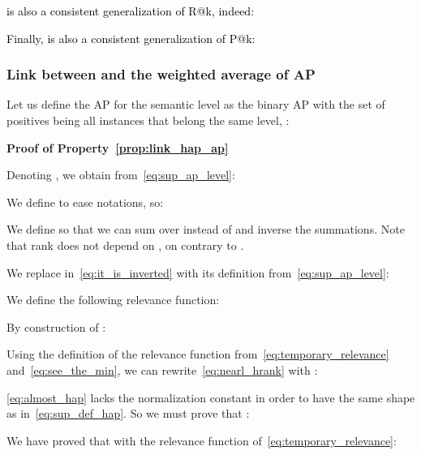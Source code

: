 \medbreak
\textcolor{black}{ is also a consistent generalization of R@k, indeed: }

\medbreak
\textcolor{black}{Finally,  is also a consistent generalization of P@k:\\ }


\subsubsection{Link between  and the weighted average of AP}

Let us define the AP for the semantic level  as the binary AP with the set of positives being all instances that belong the same level, \ie :






\medbreak
\medbreak
\textbf{Proof of Property~\ref{prop:link_hap_ap}}

\medbreak
Denoting , we obtain from~\cref{eq:sup_ap_level}:



We define  to ease notations, so:



We define  so that we can sum over  instead of  and inverse the summations. Note that rank does not depend on , on contrary to .


We replace  in~\cref{eq:it_is_inverted} with its definition from~\cref{eq:sup_ap_level}:


We define the following relevance function:

By construction of : 


Using the definition of the relevance function from~\cref{eq:temporary_relevance} and~\cref{eq:see_the_min}, we can rewrite~\cref{eq:nearl_hrank} with :





\cref{eq:almost_hap} lacks the normalization constant  in order to have the same shape as  in~\cref{eq:sup_def_hap}. So we must prove that :


We have proved that  with the relevance function of~\cref{eq:temporary_relevance}:


